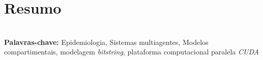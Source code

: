 
\chapter*{Resumo}

\noindent
\\

\vspace{1cm}
\noindent
\textbf{Palavras-chave: }Epidemiologia, Sistemas multiagentes, Modelos compartimentais, modelagem \textit{bitstring}, plataforma computacional paralela \textit{CUDA}


